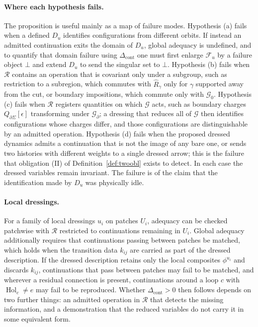 \documentclass[11pt]{article}
\theoremstyle{plain}
\theoremstyle{definition}
\theoremstyle{remark}
\newcommand{\Hol}{\operatorname{Hol}}
\newcommand{\F}{\mathcal F}
\newcommand{\G}{\mathcal G}
\newcommand{\R}{\mathcal R}
\begin{document}
\paragraph{Where each hypothesis fails.} The proposition is useful mainly as a map of failure modes. Hypothesis (a) fails when a defined $D_u$ identifies configurations from different orbits. If instead an admitted continuation exits the domain of $D_u$, global adequacy is undefined, and to quantify that domain failure using $\Delta_{\mathrm{cont}}$ one must first enlarge $\F_u$ by a failure object $\bot$ and extend $D_u$ to send the singular set to $\bot$. Hypothesis (b) fails when $\R$ contains an operation that is covariant only under a subgroup, such as restriction to a subregion, which commutes with $\widehat R_\gamma$ only for $\gamma$ supported away from the cut, or boundary impositions, which commute only with $\G_0$. Hypothesis (c) fails when $\R$ registers quantities on which $\G$ acts, such as boundary charges $Q_{\partial\Sigma}[\epsilon]$ transforming under $\G_\partial$; a dressing that reduces all of $\G$ then identifies configurations whose charges differ, and those configurations are distinguishable by an admitted operation. Hypothesis (d) fails when the proposed dressed dynamics admits a continuation that is not the image of any bare one, or sends two histories with different weights to a single dressed arrow; this is the failure that obligation (II) of Definition~\ref{def:twoobl} exists to detect.
In each case the dressed variables remain invariant. The failure is of the claim that the identification made by $D_u$ was physically idle.

\paragraph{Local dressings.} For a family of local dressings $u_i$ on patches $U_i$, adequacy can be checked patchwise with $\R$ restricted to continuations remaining in $U_i$. Global adequacy additionally requires that continuations passing between patches be matched, which holds when the transition data $k_{ij}$ are carried as part of the dressed description. If the dressed description retains only the local composites $\phi^{u_i}$ and discards $k_{ij}$, continuations that pass between patches may fail to be matched, and wherever a residual connection is present, continuations around a loop $c$ with $\Hol_c\neq e$ may fail to be reproduced. Whether $\Delta_{\mathrm{cont}}>0$ then follows depends on two further things: an admitted operation in $\R$ that detects the missing information, and a demonstration that the reduced variables do not carry it in some equivalent form.
\end{document}
